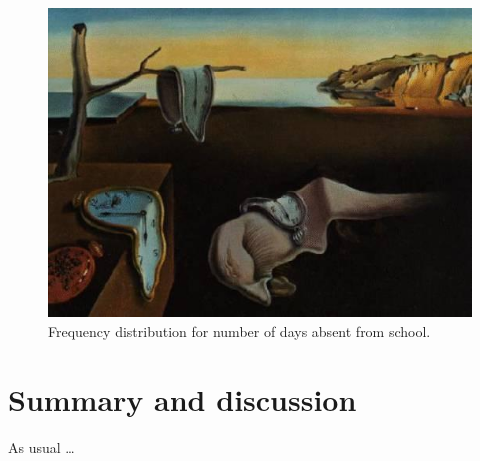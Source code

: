 \documentclass[article]{jss}
\begin{document}
\begin{figure}[h!]
\centering
\includegraphics{jsslogo}
\caption{\label{fig:quine} Frequency distribution for number of days absent
from school.}
\end{figure}


























\section{Summary and discussion} \label{sec:summary}

\begin{leftbar}
As usual \dots
\end{leftbar}
\end{document}
